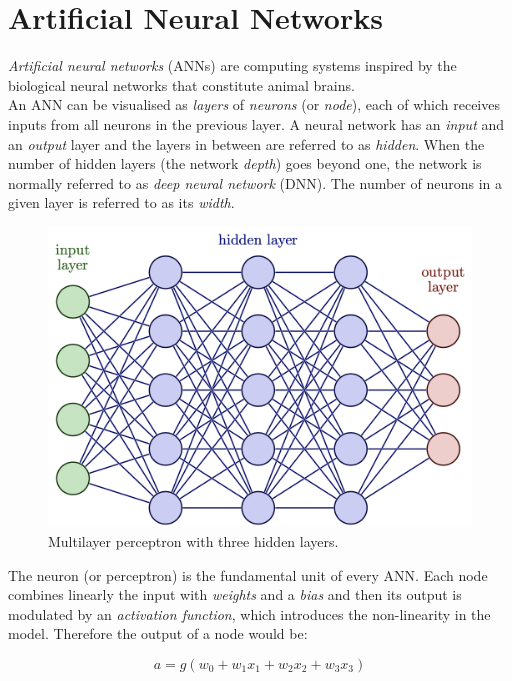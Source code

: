 \section{Artificial Neural Networks}

\textit{Artificial neural networks} (ANNs) are computing systems inspired by the biological neural networks that constitute animal brains.\\
An ANN can be visualised as \textit{layers} of \textit{neurons} (or \textit{node}), each of which receives inputs from all neurons in the previous layer.
A neural network has an \textit{input} and an \textit{output} layer and the layers in between are referred to as \textit{hidden}.
When the number of hidden layers (the network \textit{depth}) goes beyond one, the network is normally referred to as \textit{deep neural network} (DNN). 
The number of neurons in a given layer is referred to as its \textit{width}.

\begin{figure}[h]
\centering
\includegraphics[scale=0.5]{sections/Chapters/Machine-Learning/foto.png}
\caption{Multilayer perceptron with three hidden layers.}
\end{figure}

The neuron (or perceptron) is the fundamental unit of every ANN.
Each node combines linearly the input with \textit{weights} and a \textit{bias} and then its output is modulated by an \textit{activation function}, which introduces the non-linearity in the model.
Therefore the output of a node would be:

\begin{equation}
a = g(w_{0} + w_{1} x_1 + w_{2} x_2 + w_{3} x_3)
\end{equation}

